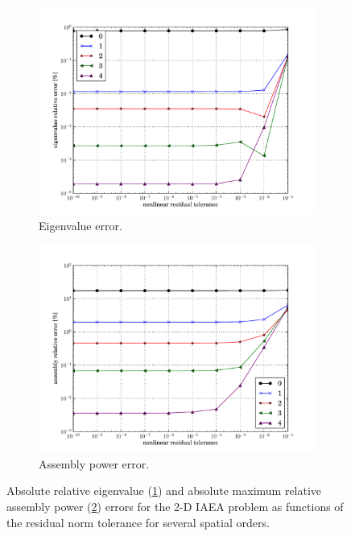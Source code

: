 \begin{figure}[htbp]
  \centering
  \begin{subfigure}{0.49\textwidth}
    \centering
    \includegraphics[keepaspectratio, width=1.0\textwidth]
                    {tolerance_study_eigenvalue}
    \caption{Eigenvalue error.}
    \label{fig:tolerance_study_eigenvalue}                   
  \end{subfigure}
  \begin{subfigure}{0.49\textwidth}
    \centering
    \includegraphics[keepaspectratio, width=1.0\textwidth]
                    {tolerance_study_power}
    \caption{Assembly power error.}
    \label{fig:tolerance_study_power}                 
  \end{subfigure}
  \caption{Absolute relative eigenvalue 
          (\ref{fig:tolerance_study_eigenvalue}) and 
          absolute maximum relative 
          assembly power
           (\ref{fig:tolerance_study_power})
          errors for the 2-D IAEA problem as functions of the
          residual norm tolerance for several spatial orders.}
  \label{fig:tolerance_study}
\end{figure}

